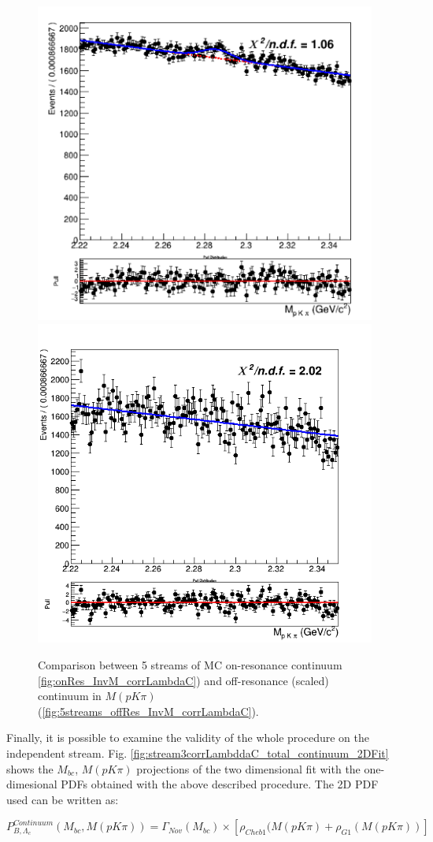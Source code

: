 \begin{figure}
\centering
\subcaptionbox{\label{fig:onRes_InvM_corrLambdaC}}
{\includegraphics[width=.45\textwidth]{04-chargedCorrBtoLambda/figs/onRes_InvM_corrLambdaC.png}} 
\subcaptionbox{\label{fig:5streams_offRes_InvM_corrLambdaC}}
{\includegraphics[width=.46\textwidth]{04-chargedCorrBtoLambda/figs/5streams_Off_resonanceRescaledContinuum_charged_corrLambdaC_oneGaussianInvMfit.png}} 
\caption{Comparison between 5 streams of MC on-resonance continuum \ref{fig:onRes_InvM_corrLambdaC}) and off-resonance (scaled) continuum in $M(p K \pi)$ (\ref{fig:5streams_offRes_InvM_corrLambdaC}).}
\end{figure}



Finally, it is possible to examine the validity of the whole procedure on the independent stream. 
Fig. \ref{fig:stream3corrLambddaC_total_continuum_2DFit} shows the $M_{bc}$, $M(p K \pi)$ projections of the two dimensional fit with the one-dimesional PDFs obtained with the above described procedure.
The 2D PDF used can be written as: \\
 \vspace{0.2 cm}

$P^{Continuum}_{B,\Lambda_c}(M_{bc}, M(p K \pi)) = \Gamma_{Nov}(M_{bc}) \times [\rho_{Cheb1}(M(p K \pi) + \rho_{G1}(M(p K \pi))]$\\
\vspace{0.2 cm}

